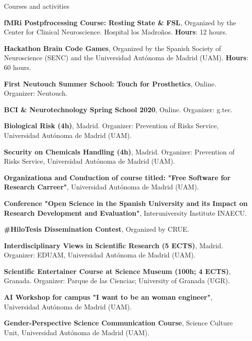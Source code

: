 \begin{rubric}{Courses and activities}

\entry*[February 2024] \textbf{fMRi Postpfrocessing Course: Resting State \& FSL}, Organized by the Center for Clinical Neuroscience. Hospital los Madroños. \textbf{Hours}: 12 hours.

\entry*[October 2021] \textbf{Hackathon Brain Code Games}, Organized by the Spanish Society of Neuroscience (SENC) and the Universidad Autónoma de Madrid (UAM). \textbf{Hours}: 60 hours.

\entry*[October 2020] \textbf{First Neutouch Summer School: Touch for Prosthetics}, Online. Organizer: Neutouch.

\entry*[April 2020] \textbf{BCI \& Neurotechnology Spring School 2020}, Online. Organizer: g.tec.


 \entry*[June 18, 2019] \textbf{Biological Risk (4h)}, Madrid. Organizer: Prevention of Risks Service, Universidad Autónoma de Madrid (UAM).

 \entry*[July 4, 2019] \textbf{Security on Chemicals Handling (4h)}, Madrid. Organizer: Prevention of Risks Service, Universidad Autónoma de Madrid (UAM).



\entry*[March 4,11, 2024] \textbf{Organizationa and Conduction of course titled: "Free Software for Research Carreer"}, Universidad Autónoma de Madrid (UAM).

\entry*[January 25, 2023] \textbf{Conference "Open Science in the Spanish University and its Impact on Research Development and Evaluation"}, Interuniversity Institute INAECU.

\entry*[May 2021] \textbf{\#HiloTesis Dissemination Contest}, Organized by CRUE.

 \textbf{Interdisciplinary Views in Scientific Research (5 ECTS)}, Madrid. Organizer: EDUAM, Universidad Autónoma de Madrid (UAM).

 \textbf{Scientific Entertainer Course at Science Museum (100h; 4 ECTS)}, Granada. Organizer: Parque de las Ciencias; University of Granada (UGR).

\entry*[June 2024] \textbf{AI Workshop for campus "I want to be an woman engineer"}, Universidad Autónoma de Madrid (UAM).

\entry*[February 2024] \textbf{Gender-Perspective Science Communication Course}, Science Culture Unit, Universidad Autónoma de Madrid (UAM).


\end{rubric}
